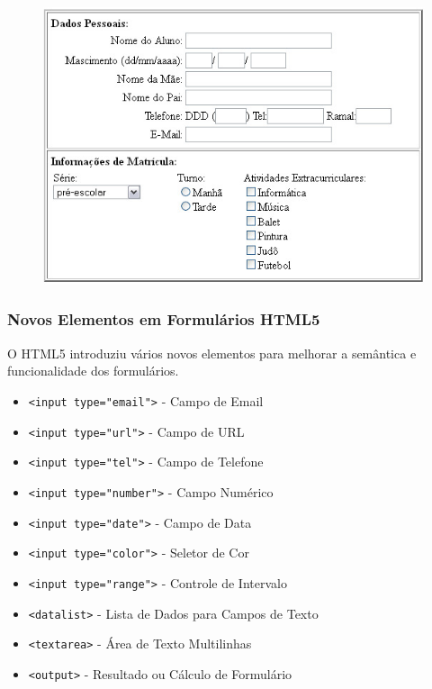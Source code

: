 \documentclass{beamer}
\begin{document}
\begin{frame}
\begin{figure}
    \centering
    \includegraphics[width=\linewidth]{img/formulario.png}

    \label{fig:enter-label}
\end{figure}
    
\end{frame}



\begin{frame}
  \frametitle{Novos Elementos em Formulários HTML5}

  O HTML5 introduziu vários novos elementos para melhorar a semântica e funcionalidade dos formulários.

  \begin{itemize}
    \item \texttt{<input type="email"}\texttt{>} - Campo de Email
    \item \texttt{<input type="url"}\texttt{>} - Campo de URL
    \item \texttt{<input type="tel"}\texttt{>} - Campo de Telefone
    \item \texttt{<input type="number"}\texttt{>} - Campo Numérico
    \item \texttt{<input type="date"}\texttt{>} - Campo de Data
    \item \texttt{<input type="color"}\texttt{>} - Seletor de Cor
    \item \texttt{<input type="range"}\texttt{>} - Controle de Intervalo
    \item \texttt{<datalist>} - Lista de Dados para Campos de Texto
    \item \texttt{<textarea>} - Área de Texto Multilinhas
    \item \texttt{<output>} - Resultado ou Cálculo de Formulário
  \end{itemize}
\end{frame}
\end{document}
